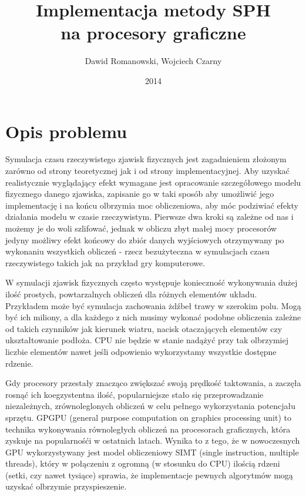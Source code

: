 \documentclass[polish, 12pt]{aghthesis}
\author{Dawid Romanowski, Wojciech Czarny}
\title{Implementacja metody SPH \\ na procesory graficzne}
\date{2014}
\begin{document}
\maketitle{}

\tableofcontents
\clearpage



\section{Opis problemu}

	Symulacja czasu rzeczywistego zjawisk fizycznych jest zagadnieniem złożonym zarówno od strony teoretycznej jak i od strony implementacyjnej. Aby uzyskać realistycznie wyglądający efekt wymagane jest opracowanie szczegółowego modelu fizycznego danego zjawiska, zapisanie go w taki sposób aby umożliwić jego implementację i na końcu olbrzymia moc obliczeniowa, aby móc podziwiać efekty działania modelu w czasie rzeczywistym. Pierwsze dwa kroki są zależne od nas i możemy je do woli szlifować, jednak w obliczu zbyt małej mocy procesorów jedyny możliwy efekt końcowy do zbiór danych wyjściowych otrzymywany po wykonaniu wszystkich obliczeń - rzecz bezużyteczna w symulacjach czasu rzeczywistego takich jak na przykład gry komputerowe.

	W symulacji zjawisk fizycznych często występuje konieczność wykonywania dużej ilość prostych, powtarzalnych obliczeń dla różnych elementów układu. Przykładem może być symulacja zachowania żdźbeł trawy w szerokim polu. Mogą być ich miliony, a dla każdego z nich musimy wykonać podobne obliczenia zależne od takich czynników jak kierunek wiatru, nacisk otaczających elementów czy ukształtowanie podłoża. CPU nie będzie w stanie nadążyć przy tak olbrzymiej liczbie elementów nawet jeśli odpowienio wykorzystamy wszystkie dostępne rdzenie. 
	

		Gdy procesory przestały znacząco zwiększać swoją prędkość taktowania, a zaczęła rosnąć ich koegzystentna ilość, popularniejsze stało się przeprowadzanie niezależnych, zrównoleglonych obliczeń w celu pełnego wykorzystania potencjału sprzętu. GPGPU (general purpose computation on graphics processing unit) to technika wykonywania równoległych obliczeń na procesorach graficznych, która zyskuje na popularnośći w ostatnich latach. Wynika to z tego, że w nowoczesnych GPU wykorzystywany jest model obliczeniowy SIMT (single instruction, multiple threads), który w połączeniu z ogromną (w stosunku do CPU) ilością rdzeni (setki, czy nawet tysiące) sprawia, że implementacje pewnych algorytmów mogą uzyskać olbrzymie przyspieszenie.
\end{document}
